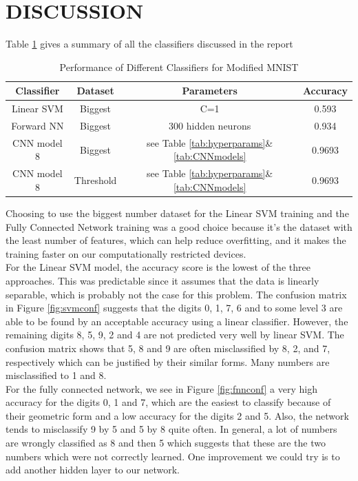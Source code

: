 \documentclass[letterpaper, 10 pt, conference]{ieeeconf}  %
\begin{document}
\section{DISCUSSION}\label{sec:discuss}
Table \ref{tab:perfAll} gives a summary of all the classifiers discussed in the report
\begin{table}
	\centering
	\caption{Performance of Different Classifiers for Modified MNIST}
	\label{tab:perfAll}
	\begin{tabular}{cccc}
		\hline
		Classifier & Dataset& Parameters & Accuracy\\\hline
		Linear SVM & Biggest &C=1 & 0.593\\
		Forward NN & Biggest & 300 hidden neurons &0.934\\
		CNN model 8& Biggest & see Table \ref{tab:hyperparams}\&\ref{tab:CNNmodels} &0.9693\\	
		CNN model 8& Threshold & see Table \ref{tab:hyperparams}\&\ref{tab:CNNmodels} &0.9693\\					
	\end{tabular}
\end{table}

Choosing to use the biggest number dataset for the Linear SVM training and the Fully Connected Network training was a good choice because it's the dataset with the least number of features, which can help reduce overfitting, and it makes the training faster on our computationally restricted devices. \\
For the Linear SVM model, the accuracy score is the lowest of the three approaches. This was predictable since it assumes that the data is linearly separable, which is probably not the case for this problem. The confusion matrix in Figure \ref{fig:svmconf} suggests that the digits 0, 1, 7, 6 and to some level 3 are able to be found by an acceptable accuracy using a linear classifier. However, the remaining digits 8, 5, 9, 2 and 4 are not predicted very well by linear SVM. The confusion matrix shows that 5, 8 and 9 are often misclassified by 8, 2, and 7, respectively which can be justified by their similar forms. Many numbers are misclassified to 1 and 8.\\
For the fully connected network, we see in Figure \ref{fig:fnnconf} a very high accuracy for the digits 0, 1 and 7, which are the easiest to classify because of their geometric form and a low accuracy for the digits 2 and 5. Also, the network tends to misclassify 9 by 5 and 5 by 8 quite often. In general, a lot of numbers are wrongly classified as 8 and then 5 which suggests that these are the two numbers which were not correctly learned.
One improvement we could try is to add another hidden layer to our network. \\
\end{document}
